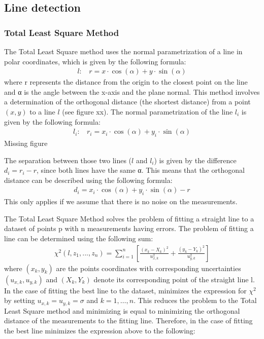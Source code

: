 \documentclass[../Head/Main.tex]{subfiles}
\begin{document}
\subsection{Line detection}
\subsubsection{Total Least Square Method}
The Total Least Square method uses the normal parametrization of a line in polar coordinates, which is given by the following formula:
\begin{align}
    l:~~~~r = x\cdot\cos(\alpha)+y\cdot\sin(\alpha)
\end{align}
where r represents the distance from the origin to the closest point on the line and α is the angle between the x-axis and the plane normal. This method involves a determination of the orthogonal distance (the shortest distance) from a point $(x,y)$ to a line $l$ (see figure xx). The normal parametrization of the line $l_i$ is given by the following formula:
\begin{align}
    l_i:~~~~r_i = x_i\cdot\cos(\alpha)+y_i\cdot\sin(\alpha)
\end{align}
{\color{red} Missing figure} \par
The separation between those two lines ($l$ and $l_i$) is given by the difference $d_i=r_i-r$, since both lines have the same α. This means that the orthogonal distance can be described using the following formula:
\begin{align}
    d_i = x_i\cdot\cos(\alpha)+y_i\cdot\sin(\alpha) - r
\end{align}
This only applies if we assume that there is no noise on the measurements. \par
The Total Least Square Method solves the problem of fitting a straight line to a dataset of points p with n measurements having errors. The problem of fitting a line can be determined using the following sum:
\begin{align}
    \chi^2\left(l, z_1, ..., z_n\right) = \sum_{i = 1}^{n} \left[\frac{\left(x_k - X_k\right)^2}{u_{x, k}^{2}} + \frac{\left(y_k - Y_k\right)^2}{u_{y, k}^{2}}\right]
\end{align}
where $(x_k,y_k)$ are the points coordinates with corresponding uncertainties $(u_{x, k},u_{y, k})$ and $(X_k,Y_k)$ denote its corresponding point of the straight line l. In the case of fitting the best line to the dataset, minimizes the expression for $\chi^2$ by setting $u_{x, k}=u_{y, k}=\sigma$ and $k=1,…,n$. This reduces the problem to the Total Least Square method and minimizing is equal to minimizing the orthogonal distance of the measurements to the fitting line. Therefore, in the case  of fitting the best line minimizes the expression above to the following:
\end{document}
